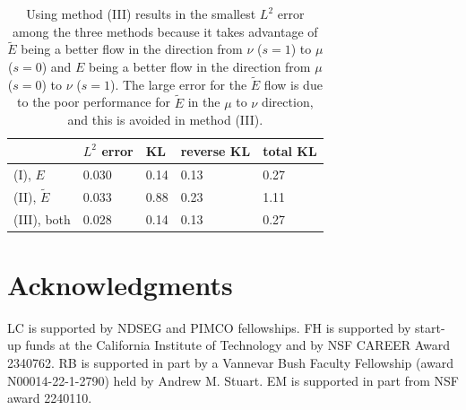 \documentclass[11pt,a4paper,final]{article}
\newcommand{\1}{\mathbf{1}}
\theoremstyle{plain}
\numberwithin{equation}{section}
\numberwithin{theorem}{section}
\begin{document}
\begin{table}[]
    \centering
    \begin{tabular}{m{5em}||m{5em}|m{5em}|m{5em}|m{5em}}
       & $L^2$ error & KL & reverse KL & total KL  \\
        \hline
     (I), $E$        & 0.030 & 0.14 & 0.13 & 0.27 \\
     (II), $\tilde E$ & 0.033 & 0.88 & 0.23 & 1.11 \\
     (III), both       & 0.028 & 0.14 & 0.13 & 0.27
    \end{tabular}
    \caption{Using method (III)
    results in the smallest $L^2$ error among the three methods because it takes advantage of $\tilde E$ being a better flow in the direction from $\nu$ ($s=1$) to $\mu$ ($s=0$) and $E$ being a better flow in the direction from $\mu$ ($s=0$) to $\nu$ ($s=1$). The large error for the $\tilde E$ flow is due to the poor performance for $\tilde E$ in the $\mu$ to $\nu$ direction, and this is avoided in method (III). }
    \label{tab:KL_switching}
\end{table}

\section*{Acknowledgments}
LC is supported by NDSEG and PIMCO fellowships. FH is supported by start-up funds at the California Institute of Technology and by NSF CAREER Award 2340762. RB is supported in part by a Vannevar Bush Faculty Fellowship (award N00014-22-1-2790) held by Andrew M. Stuart. EM is supported in part from NSF award 2240110.

\printbibliography
\end{document}
